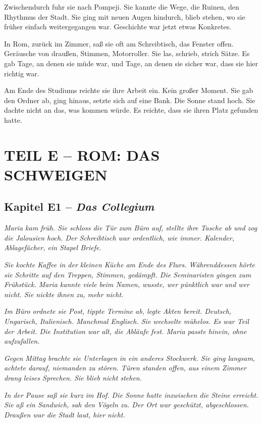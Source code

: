 \documentclass[
]{article}
\begin{document}
Zwischendurch fuhr sie nach Pompeji. Sie kannte die Wege, die Ruinen, den Rhythmus der Stadt. Sie ging mit neuen Augen hindurch, blieb stehen, wo sie früher einfach weitergegangen war. Geschichte war jetzt etwas Konkretes.

In Rom, zurück im Zimmer, saß sie oft am Schreibtisch, das Fenster offen. Geräusche von draußen, Stimmen, Motorroller. Sie las, schrieb, strich Sätze. Es gab Tage, an denen sie müde war, und Tage, an denen sie sicher war, dass sie hier richtig war.

Am Ende des Studiums reichte sie ihre Arbeit ein. Kein großer Moment. Sie gab den Ordner ab, ging hinaus, setzte sich auf eine Bank. Die Sonne stand hoch. Sie dachte nicht an das, was kommen würde. Es reichte, dass sie ihren Platz gefunden hatte.

\section{TEIL E -- ROM: DAS SCHWEIGEN}\label{teil-e-rom-das-schweigen}

\subsection{\texorpdfstring{Kapitel E1 -- \emph{Das Collegium}}{Kapitel E1 -- Das Collegium}}\label{kapitel-e1-das-collegium}

\emph{Maria kam früh. Sie schloss die Tür zum Büro auf, stellte ihre Tasche ab und zog die Jalousien hoch. Der Schreibtisch war ordentlich, wie immer. Kalender, Ablagefächer, ein Stapel Briefe.}

\emph{Sie kochte Kaffee in der kleinen Küche am Ende des Flurs. Währenddessen hörte sie Schritte auf den Treppen, Stimmen, gedämpft. Die Seminaristen gingen zum Frühstück. Maria kannte viele beim Namen, wusste, wer pünktlich war und wer nicht. Sie nickte ihnen zu, mehr nicht.}

\emph{Im Büro ordnete sie Post, tippte Termine ab, legte Akten bereit. Deutsch, Ungarisch, Italienisch. Manchmal Englisch. Sie wechselte mühelos. Es war Teil der Arbeit. Die Institution war alt, die Abläufe fest. Maria passte hinein, ohne aufzufallen.}

\emph{Gegen Mittag brachte sie Unterlagen in ein anderes Stockwerk. Sie ging langsam, achtete darauf, niemanden zu stören. Türen standen offen, aus einem Zimmer drang leises Sprechen. Sie blieb nicht stehen.}

\emph{In der Pause saß sie kurz im Hof. Die Sonne hatte inzwischen die Steine erreicht. Sie aß ein Sandwich, sah den Vögeln zu. Der Ort war geschützt, abgeschlossen. Draußen war die Stadt laut, hier nicht.}
\end{document}
